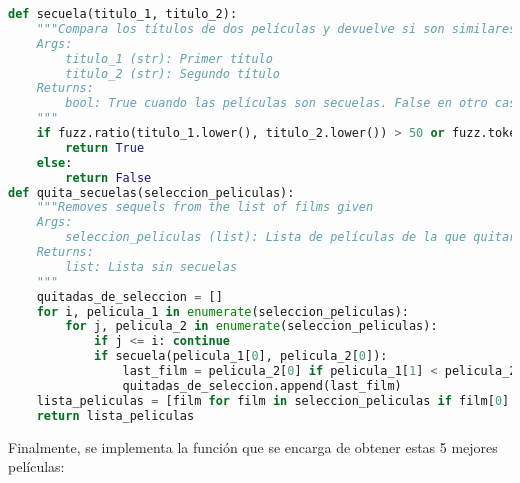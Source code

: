 \begin{lstlisting}[language=Python, label={lst:sequel},caption={Determinación de si dos películas son o no secuelas y eliminarlas. Se determina que dos películas son secuelas si tienen el mismo título o es muy similar. Para ello se utilizan técnicas de lógica difusa. Si una de las posibles recomendaciones es unas secuela de la dada por el usuario, esta se elimina, ya que se recomendarían películas demasiado similares.}]
def secuela(titulo_1, titulo_2):   
    """Compara los títulos de dos películas y devuelve si son similares o no
    Args:
        titulo_1 (str): Primer título
        titulo_2 (str): Segundo título
    Returns:
        bool: True cuando las películas son secuelas. False en otro caso
    """
    if fuzz.ratio(titulo_1.lower(), titulo_2.lower()) > 50 or fuzz.token_set_ratio(titulo_1.lower(), titulo_2.lower()) > 60:
        return True
    else:
        return False
def quita_secuelas(seleccion_peliculas):
    """Removes sequels from the list of films given
    Args:
        seleccion_peliculas (list): Lista de películas de la que quitar las secuelas
    Returns:
        list: Lista sin secuelas
    """ 
    quitadas_de_seleccion = []
    for i, pelicula_1 in enumerate(seleccion_peliculas):
        for j, pelicula_2 in enumerate(seleccion_peliculas):
            if j <= i: continue 
            if secuela(pelicula_1[0], pelicula_2[0]): 
                last_film = pelicula_2[0] if pelicula_1[1] < pelicula_2[1] else pelicula_1[0]
                quitadas_de_seleccion.append(last_film)
    lista_peliculas = [film for film in seleccion_peliculas if film[0] not in quitadas_de_seleccion]
    return lista_peliculas
\end{lstlisting}

Finalmente, se implementa la función que se encarga de obtener estas 5 mejores películas:

